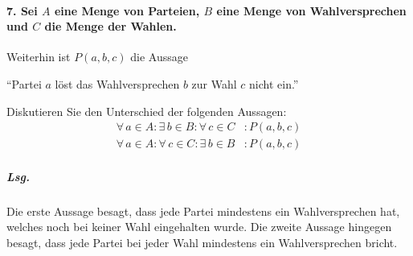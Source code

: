 \documentclass{scrreprt}
\begin{document}
\paragraph{7. Sei $A$ eine Menge von Parteien, $B$ eine Menge von Wahlversprechen
  und $C$ die Menge der Wahlen.}
Weiterhin ist $P(a, b, c)$ die Aussage
\begin{center}
  ``Partei $a$ löst das Wahlversprechen $b$ zur Wahl $c$ nicht ein.'' 
\end{center}

Diskutieren Sie den Unterschied der folgenden Aussagen:
\renewcommand{\theequation}{\arabic{equation}}
\begin{align}
  \forall \, a \in A \colon \exists \, b \in B \colon \forall \, c \in C &\colon P(a, b, c) \\
  \forall \, a \in A \colon \forall \, c \in C \colon \exists \, b \in B &\colon P(a, b, c)
\end{align}

\subparagraph{Lsg.}
Die erste Aussage besagt, dass jede Partei mindestens ein Wahlversprechen hat,
welches noch bei keiner Wahl eingehalten wurde.
Die zweite Aussage hingegen besagt, dass jede Partei bei jeder Wahl mindestens
ein Wahlversprechen bricht.
\end{document}
